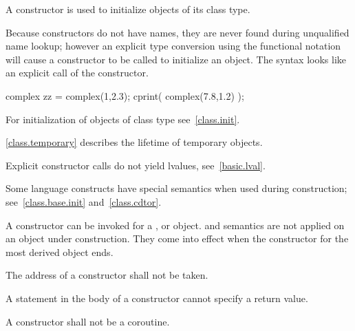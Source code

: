 \pnum
{}%
A constructor is used to initialize objects of its class type.
\begin{note}
Because constructors do not have names, they are never found during
unqualified name lookup; however an explicit type conversion using the functional
notation will cause a constructor to be called to
initialize an object.
The syntax looks like an explicit call of the constructor.
\end{note}
\begin{example}
\begin{codeblock}
complex zz = complex(1,2.3);
cprint( complex(7.8,1.2) );
\end{codeblock}
\end{example}
\begin{note}
For initialization of objects of class type see~\ref{class.init}.
\end{note}
\begin{note}
\ref{class.temporary} describes the lifetime of temporary objects.
\end{note}
\begin{note}
Explicit constructor calls do not yield lvalues, see~\ref{basic.lval}.
\end{note}

\pnum
\begin{note}
%
Some language constructs have special semantics when used during construction;
see~\ref{class.base.init} and~\ref{class.cdtor}.
\end{note}

\pnum
{}%
%
A constructor can be invoked for a
,
or
object.
%
and
semantics are not applied on an object under construction.
They come into effect when the constructor for the
most derived object ends.

\pnum
{}%
The address of a constructor shall not be taken.
%
\begin{note}
A  statement in the body of a constructor
cannot specify a return value.
\end{note}

\pnum
A constructor shall not be a coroutine.

